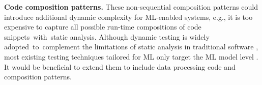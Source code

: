 \textbf{Code composition patterns.} These non-sequential composition patterns could introduce additional dynamic complexity for ML-enabled systems, e.g., it is too expensive to capture all possible run-time compositions of code snippets~with~static analysis. Although dynamic testing is widely adopted~to~complement the limitations of static analysis in traditional software \cite{fairley1978tutorial}, most existing testing techniques tailored for ML only target the ML model level \cite{ml_testing}. It would be beneficial to extend them to include data processing code and composition patterns.
